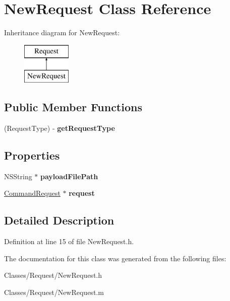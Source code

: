 \hypertarget{interface_new_request}{
\section{NewRequest Class Reference}
\label{interface_new_request}
}
Inheritance diagram for NewRequest:\begin{figure}[H]
\begin{center}
\leavevmode
\includegraphics[height=2.000000cm]{interface_new_request}
\end{center}
\end{figure}
\subsection*{Public Member Functions}
\begin{DoxyCompactItemize}
\item 
\hypertarget{interface_new_request_a2435d6218c1be36166236f0147a5f6f6}{
(RequestType) -\/ {\bfseries getRequestType}}
\label{interface_new_request_a2435d6218c1be36166236f0147a5f6f6}

\end{DoxyCompactItemize}
\subsection*{Properties}
\begin{DoxyCompactItemize}
\item 
\hypertarget{interface_new_request_aa8fbe624211e17a0d32d1252791b7b94}{
NSString $\ast$ {\bfseries payloadFilePath}}
\label{interface_new_request_aa8fbe624211e17a0d32d1252791b7b94}

\item 
\hypertarget{interface_new_request_ac82409f84f2b0afb8a35f4dad0ad25a7}{
\hyperlink{interface_command_request}{CommandRequest} $\ast$ {\bfseries request}}
\label{interface_new_request_ac82409f84f2b0afb8a35f4dad0ad25a7}

\end{DoxyCompactItemize}


\subsection{Detailed Description}


Definition at line 15 of file NewRequest.h.



The documentation for this class was generated from the following files:\begin{DoxyCompactItemize}
\item 
Classes/Request/NewRequest.h\item 
Classes/Request/NewRequest.m\end{DoxyCompactItemize}
